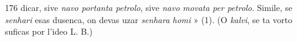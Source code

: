 \begin{VUpage}[180]{176}
\VUcontinue
dicar, sive \textit{navo portanta petrolo}, sive \textit{navo movata per petrolo}.\nl
Simile, se \textit{senhari} esas dusenca, on devas uzar \textit{senhara}\nl
\textit{homi} » (1). (O \textit{kalvi}, se ta vorto suficas por l'ideo L. B.)

\end{VUpage}

\begin{VUpage}[181]{}
\end{VUpage}

\begin{VUpage}[182]{}
\end{VUpage}

